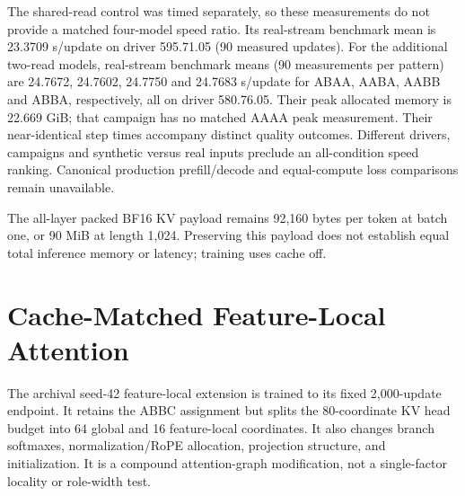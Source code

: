 \documentclass[11pt,letterpaper]{article}
\newcommand{\route}[1]{\textsf{#1}}
\begin{document}
\begin{table}[!ht]
\centering\footnotesize\setlength{\tabcolsep}{4pt}

\caption{Full optimizer-update timing on one RTX 5090, driver 580.105.08:
three blocks, each with three warmups and ten
measured full optimizer updates. Rate columns are $32,768/\bar t$ input
positions/s and $32,736/\bar t$ supervised targets/s, not end-to-end campaign
rates. Peak allocated memory is not reserved or total device memory. These
measurements exclude scientific checkpoint transfer and scoring.}
\label{tab:canonical-timing}
\end{table}
The shared-read control was timed separately, so these measurements do not
provide a matched four-model speed ratio. Its real-stream benchmark mean is
23.3709 s/update on driver 595.71.05 (90 measured updates).
For the additional two-read models, real-stream benchmark means
(90 measurements per pattern) are
24.7672, 24.7602, 24.7750 and 24.7683 s/update for
\route{ABAA}, \route{AABA}, \route{AABB} and \route{ABBA}, respectively,
all on driver 580.76.05. Their peak allocated memory is 22.669 GiB;
that campaign has no matched \route{AAAA} peak measurement.
Their near-identical step times accompany distinct quality outcomes.
Different drivers, campaigns and synthetic versus real inputs preclude an
all-condition speed ranking. Canonical production prefill/decode and
equal-compute loss comparisons remain unavailable.

The all-layer packed BF16 KV payload remains 92,160 bytes per token at
batch one, or 90 MiB at length 1,024. Preserving this payload does not
establish equal total inference memory or latency; training uses cache off.

\section{Cache-Matched Feature-Local Attention}
\label{app:compound}
The archival seed-42 feature-local extension is trained to its fixed
2,000-update endpoint. It retains the \route{ABBC} assignment but splits the 80-coordinate
KV head budget into 64 global and 16 feature-local coordinates. It also changes
branch softmaxes, normalization/RoPE allocation, projection structure, and
initialization. It is a compound attention-graph modification, not a
single-factor locality or role-width test.
\end{document}

